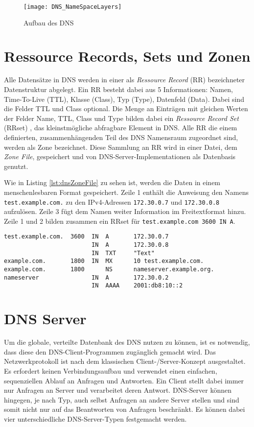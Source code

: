 \begin{figure}[!hb]
    \centering
    \texttt{[image: DNS\_NameSpaceLayers]}
    \caption{Aufbau des DNS}
    \label{img:dnsnamespace}
\end{figure}

\section{Ressource Records, Sets und Zonen}

Alle Datensätze in DNS werden in einer als \textit{Ressource Record} (RR) bezeichneter Datenstruktur abgelegt. Ein RR besteht dabei aus 5 Informationen: Namen, Time-To-Live (TTL), Klasse (Class), Typ (Type), Datenfeld (Data). Dabei sind die Felder TTL und Class optional. Die Menge an Einträgen mit gleichen Werten der Felder Name, TTL, Class und Type bilden dabei ein \textit{Ressource Record Set} (RRset) \cite{rfc2181}, das kleinstmögliche abfragbare Element in DNS. Alle RR die einem definierten, zusammenhängenden Teil des DNS Namensraum zugeordnet sind, werden als Zone bezeichnet. Diese Sammlung an RR wird in einer Datei, dem \textit{Zone File}, gespeichert und von DNS-Server-Implementationen als Datenbasis genutzt.   

Wie in Listing \ref{lst:dnsZoneFile} zu sehen ist, werden die Daten in einem menschenlesbaren Format gespeichert. Zeile 1 enthält die Anweisung den Namens \texttt{test.example.com.} zu den IPv4-Adressen \texttt{172.30.0.7} und \texttt{172.30.0.8} aufzulösen. Zeile 3 fügt dem Namen weiter Information im Freitextformat hinzu. Zeile 1 und 2 bilden zusammen ein RRset für \texttt{test.example.com 3600 IN A}.

\begin{lstlisting}[caption={Ausschnitt aus dem Zone-File \textit{example.com}}, label={lst:dnsZoneFile}]
test.example.com.  3600  IN  A       172.30.0.7
                         IN  A       172.30.0.8
                         IN  TXT     "Text"
example.com.       1800  IN  MX      10 test.example.com.
example.com.       1800      NS      nameserver.example.org.
nameserver               IN  A       172.30.0.2
                         IN  AAAA    2001:db8:10::2
\end{lstlisting}

\section{DNS Server}
\label{sec:dnsserver}

Um die globale, verteilte Datenbank des DNS nutzen zu können, ist es notwendig, dass diese den DNS-Client-Programmen zugänglich gemacht wird. Das Netzwerkprotokoll ist nach dem klassischen Client-/Server-Konzept ausgestaltet. Es erfordert keinen Verbindungsaufbau und verwendet einen einfachen, sequenziellen Ablauf an Anfragen und Antworten. Ein Client stellt dabei immer nur Anfragen an Server und verarbeitet deren Antwort. DNS-Server können hingegen, je nach Typ, auch selbst Anfragen an andere Server stellen und sind somit nicht nur auf das Beantworten von Anfragen beschränkt. Es können dabei vier unterschiedliche DNS-Server-Typen festgemacht werden.

